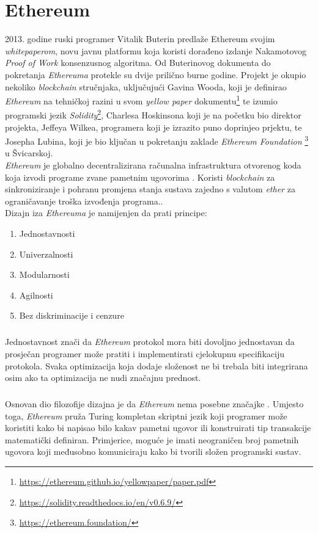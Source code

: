 \documentclass[times, utf8, zavrsni, numeric]{fer}
\begin{document}
\chapter{Ethereum}
2013. godine ruski programer Vitalik Buterin predlaže Ethereum svojim \emph{whitepaperom}, novu javnu platformu koja koristi 
dorađeno izdanje Nakamotovog \emph{Proof of Work} konsenzusnog algoritma.
Od Buterinovog dokumenta do pokretanja \emph{Ethereuma} protekle su dvije prilično burne godine. Projekt je okupio nekoliko \emph{blockchain} stručnjaka, uključujući
Gavina Wooda, koji je definirao \emph{Ethereum} na tehničkoj razini u svom \emph{yellow paper} dokumentu\footnote{\url{https://ethereum.github.io/yellowpaper/paper.pdf}} te
izumio programski jezik \emph{Solidity}\footnote{\url{https://solidity.readthedocs.io/en/v0.6.9/}}, Charlesa Hoskinsona koji je na početku bio direktor projekta, Jeffeya
Wilkea, programera koji je izrazito puno doprinjeo prjektu, te Josepha Lubina, koji je bio ključan u pokretanju zaklade \emph{Ethereum Foundation}
\footnote{\url{https://ethereum.foundation/}} u Švicarskoj.\citep{ffzg} \\
 \emph{Ethereum} je globalno decentralizirana računalna infrastruktura otvorenog koda koja
izvodi programe zvane pametnim ugovorima . Koristi \emph{blockchain} za sinkroniziranje i pohranu promjena stanja sustava zajedno s valutom \emph{ether}
za ograničavanje troška izvođenja programa.\citep{masteringEth}. \\
Dizajn iza \emph{Ethereuma} je namijenjen da prati principe:

\begin{enumerate}
  \item Jednostavnosti
  \item Univerzalnosti
  \item Modularnosti
  \item Agilnosti
  \item Bez diskriminacije i cenzure
\end{enumerate}

\paragraph{}
Jednostavnost znači da \emph{Ethereum} protokol mora biti dovoljno jednostavan da prosječan programer može pratiti i implementirati cjelokupnu specifikaciju protokola.
Svaka optimizacija koja dodaje složenost ne bi trebala biti integrirana osim ako ta optimizacija ne nudi značajnu prednost.
\paragraph{}
Osnovan dio filozofije dizajna je da \emph{Ethereum} nema posebne značajke . Umjesto toga, \emph{Ethereum} pruža Turing kompletan skriptni jezik koji programer
može koristiti kako bi napisao bilo kakav pametni ugovor ili konstruirati tip transakcije matematički definiran. Primjerice, moguće je imati neograničen broj pametnih ugovora
koji međusobno komuniciraju kako bi tvorili složen programski sustav.
\end{document}
